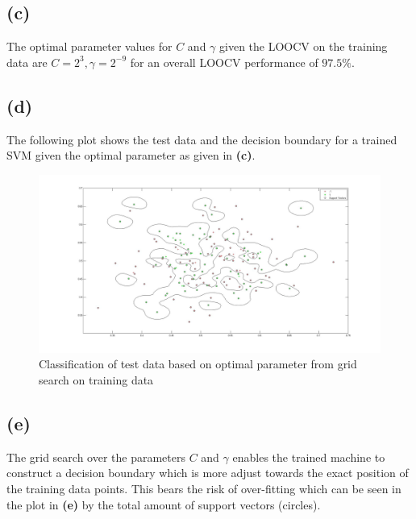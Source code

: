 \documentclass[11pt,a4paper]{article}
\begin{document}
\subsection*{(c)}
The optimal parameter values for $C$ and $\gamma$ given the LOOCV on the training data are
$C = 2^{3}, \gamma = 2^{-9}$ for an overall LOOCV performance of $97.5\%$.

\subsection*{(d)}
The following plot shows the test data and the decision boundary for a trained SVM given the optimal parameter as given in \textbf{(c)}.
\begin{figure}[h]
	\includegraphics[width=\linewidth]{test_dat_model.jpg}
	\caption{Classification of test data based on optimal parameter from grid search on training data}
\end{figure}

\subsection*{(e)}
The grid search over the parameters $C$ and $\gamma$ enables the trained machine to construct a decision boundary which is more adjust towards the exact position of the training data points. This bears the risk of over-fitting which can be seen in the plot in \textbf{(e)} by the total amount of support vectors (circles).
\end{document}

